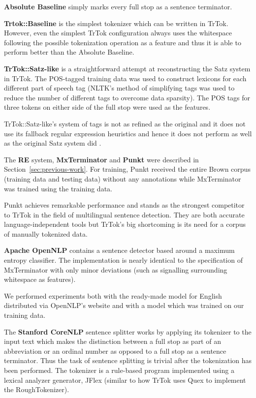 \textbf{Absolute Baseline} simply marks every full stop as a sentence
terminator.

\textbf{Trtok::Baseline} is the simplest tokenizer which can be
written in TrTok. However, even the simplest TrTok configuration
always uses the whitespace following the possible tokenization
operation as a feature and thus it is able to perform better than the
Absolute Baseline.

\textbf{TrTok::Satz-like} is a straightforward attempt at
reconstructing the Satz system in TrTok. The POS-tagged training data
was used to construct lexicons for each different part of speech tag
(NLTK's method of simplifying tags was used to reduce the number of
different tags to overcome data sparsity). The POS tags for three
tokens on either side of the full stop were used as the features.

TrTok::Satz-like's system of tags is not as refined as the original
and it does not use its fallback regular expression heuristics and
hence it does not perform as well as the original Satz system did
\cite{sbd-satz}.

The \textbf{RE} system, \textbf{MxTerminator} and \textbf{Punkt} were
described in Section~\ref{sec:previous-work}. For training, Punkt
received the entire Brown corpus (training data and testing data)
without any annotations while MxTerminator was trained using the
training data.

Punkt achieves remarkable performance and stands as the strongest
competitor to TrTok in the field of multilingual sentence detection.
They are both accurate language-independent tools but TrTok's big
shortcoming is its need for a corpus of manually tokenized data.

\textbf{Apache OpenNLP} contains a sentence detector based around a
maximum entropy classifier. The implementation is nearly identical to
the specification of MxTerminator with only minor deviations (such as
signalling surrounding whitespace as features).

We performed experiments both with the ready-made model for English
distributed via OpenNLP's website and with a model which was trained
on our training data.

The \textbf{Stanford CoreNLP} sentence splitter works by applying its
tokenizer to the input text which makes the distinction between a full
stop as part of an abbreviation or an ordinal number as opposed to a
full stop as a sentence terminator. Thus the task of sentence
splitting is trivial after the tokenization has been performed. The
tokenizer is a rule-based program implemented using a lexical analyzer
generator, JFlex (similar to how TrTok uses Quex to implement the
RoughTokenizer).

